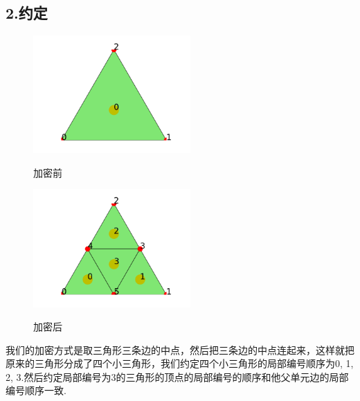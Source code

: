\documentclass{article}
\begin{document}
\subsection{2.约定}
\begin{figure}[H]
\centering
\begin{minipage}[!htbp]{0.3\linewidth}
    \centerline{\includegraphics[width=6cm]{./figures/Figure_3.png}}
    \centerline{加密前}
\end{minipage}
\hspace{0.25in}		
\begin{minipage}[!htbp]{0.3\linewidth}
    \centerline{\includegraphics[width=6cm]{./figures/Figure_2.png}}
    \centerline{加密后}
\end{minipage}
\end{figure}
我们的加密方式是取三角形三条边的中点，然后把三条边的中点连起来，这样就把原来的三角形分成了四个小三角形，我们约定四个小三角形的局部编号顺序为0, 1, 2, 3.然后约定局部编号为3的三角形的顶点的局部编号的顺序和他父单元边的局部编号顺序一致.
\end{document}
